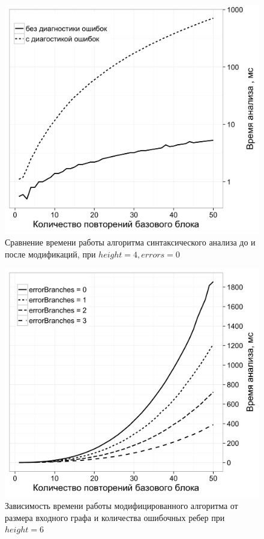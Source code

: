 \begin{figure}[h!]
 \centering
 \includegraphics[width=\textwidth]{Azimov/pictures/compare_black.png}
 \caption{Сравнение времени работы алгоритма синтаксического анализа до и после модификаций, при $height=4, errors=0$}
 \label{compare}
\end{figure}
\begin{figure}[h!]
 \centering
 \includegraphics[width=\textwidth]{Azimov/pictures/error_branches4_black.png}
 \caption{Зависимость времени работы модифицированного алгоритма от размера входного графа и количества ошибочных ребер при $height=6$}
 \label{withErrors}
\end{figure}